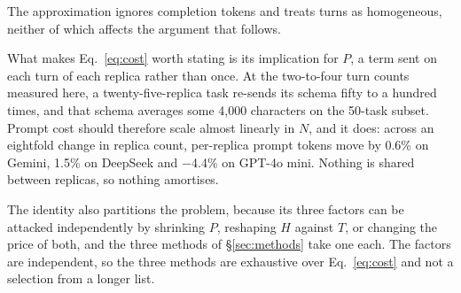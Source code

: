 \documentclass[conference]{IEEEtran}
\begin{document}
The approximation ignores completion tokens and treats turns as homogeneous,
neither of which affects the argument that follows.

What makes Eq.~\ref{eq:cost} worth stating is its implication for $P$, a term
sent on each turn of each replica rather than once. At the two-to-four turn
counts measured here, a twenty-five-replica task re-sends its schema fifty to a
hundred times, and that schema averages some 4{,}000 characters on the 50-task
subset. Prompt cost should therefore scale almost linearly in $N$, and it does: across
an eightfold change in replica count, per-replica prompt tokens move by 0.6\% on
Gemini, 1.5\% on DeepSeek and $-$4.4\% on GPT-4o mini. Nothing is shared between
replicas, so nothing amortises.

The identity also partitions the problem, because its three factors can be
attacked independently by shrinking $P$, reshaping $H$ against $T$, or changing
the price of both, and the three methods of §\ref{sec:methods} take one each. The
factors are independent, so the three methods are exhaustive over
Eq.~\ref{eq:cost} and not a selection from a longer list.
\end{document}

